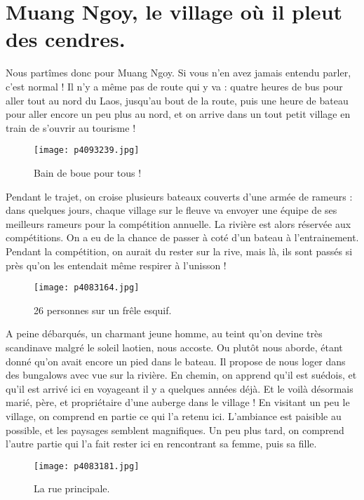 \documentclass{book}
\begin{document}
\chapter{Muang Ngoy, le village où il pleut des cendres.}
Nous partîmes donc pour Muang Ngoy. Si vous n'en avez jamais entendu parler, c'est normal ! Il n'y a même pas de route qui y va : quatre heures de bus pour aller tout au nord du Laos, jusqu'au bout de la route, puis une heure de bateau pour aller encore un peu plus au nord, et on arrive dans un tout petit village en train de s'ouvrir au tourisme !


\begin{figure}[h]
\centering
\texttt{[image: p4093239.jpg]}
\caption*{Bain de boue pour tous !}
\end{figure}

Pendant le trajet, on croise plusieurs bateaux couverts d'une armée de rameurs : dans quelques jours, chaque village sur le fleuve va envoyer une équipe de ses meilleurs rameurs pour la compétition annuelle. La rivière est alors réservée aux compétitions. On a eu de la chance de passer à coté d'un bateau à l'entrainement. Pendant la compétition, on aurait du rester sur la rive, mais là, ils sont passés si près qu'on les entendait même respirer à l'unisson !


\begin{figure}[h]
\centering
\texttt{[image: p4083164.jpg]}
\caption*{26 personnes sur un frêle esquif.}
\end{figure}

A peine débarqués, un charmant jeune homme, au teint qu'on devine très scandinave malgré le soleil laotien, nous accoste. Ou plutôt nous aborde, étant donné qu'on avait encore un pied dans le bateau. Il propose de nous loger dans des bungalows avec vue sur la rivière. En chemin, on apprend qu'il est suédois, et qu'il est arrivé ici en voyageant il y a quelques années déjà. Et le voilà désormais marié, père, et propriétaire d'une auberge dans le village ! En visitant un peu le village, on comprend en partie ce qui l'a retenu ici. L'ambiance est paisible au possible, et les paysages semblent magnifiques. Un peu plus tard, on comprend l'autre partie qui l'a fait rester ici en rencontrant sa femme, puis sa fille.


\begin{figure}[h]
\centering
\texttt{[image: p4083181.jpg]}
\caption*{La rue principale.}
\end{figure}
\end{document}
